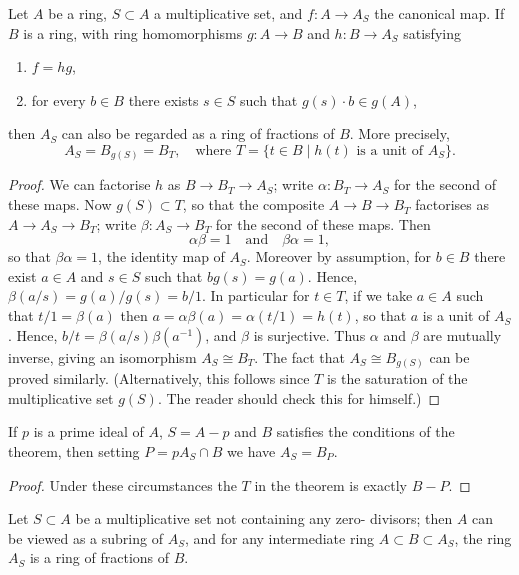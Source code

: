 \begin{theorem}\label{thm:4.3}
Let $A$ be a ring, $S \subset A$ a multiplicative set, and
$f\colon A \to A_S$ the canonical map. If $B$ is a ring, with ring homomorphisms
$g\colon A \to B$ and $h\colon B \to A_S$ satisfying
\begin{enumerate}[(1)]
  \item $f = hg$,
  \item for every $b \in B$ there exists $s \in S$ such that $g(s) \cdot b \in g(A)$,
\end{enumerate}
then $A_S$ can also be regarded as a ring of fractions of $B$. More precisely,
\[
  A_S = B_{g(S)} = B_T, \quad \text{where } T = \{t \in B \mid h(t) \text{ is a unit of } A_S\}.
\]
\end{theorem}

\begin{proof}
We can factorise $h$ as $B \to B_T \to A_S$; write $\alpha\colon B_T \to A_S$ for
the second of these maps. Now $g(S) \subset T$, so that the composite $A \to B
\to B_T$ factorises as $A \to A_S \to B_T$; write $\beta\colon A_S \to B_T$ for the second of
these maps. Then
\[
  \alpha\beta = 1 \quad \text{and} \quad \beta\alpha = 1,
\]
so that $\beta\alpha = 1$, the identity map of $A_S$. Moreover by assumption, for $b \in B$
there exist $a \in A$ and $s \in S$ such that $bg(s) = g(a)$. Hence, $\beta(a/s) = g(a)/g(s) =
b/1$. In particular for $t \in T$, if we take $a \in A$ such that $t/1 = \beta(a)$ then
$a = \alpha\beta(a) = \alpha(t/1) = h(t)$, so that $a$ is a unit of $A_S$. Hence, $b/t = \beta(a/s)\beta(a^{-1})$,
and $\beta$ is surjective. Thus $\alpha$ and $\beta$ are mutually inverse, giving an
isomorphism $A_S \cong B_T$. The fact that $A_S \cong B_{g(S)}$ can be proved similarly.
(Alternatively, this follows since $T$ is the saturation of the multiplicative
set $g(S)$. The reader should check this for himself.)
\end{proof}

\begin{corollarynum}\label{cor:4.1}
If $p$ is a prime ideal of $A$, $S = A - p$ and $B$ satisfies the
conditions of the theorem, then setting $P = pA_S \cap B$ we have $A_S = B_P$.
\end{corollarynum}

\begin{proof}
Under these circumstances the $T$ in the theorem is exactly $B - P$.
\end{proof}

\begin{corollarynum}\label{cor:4.2}
Let $S \subset A$ be a multiplicative set not containing any zero-
divisors; then $A$ can be viewed as a subring of $A_S$, and for any intermediate
ring $A \subset B \subset A_S$, the ring $A_S$ is a ring of fractions of $B$.
\end{corollarynum}

